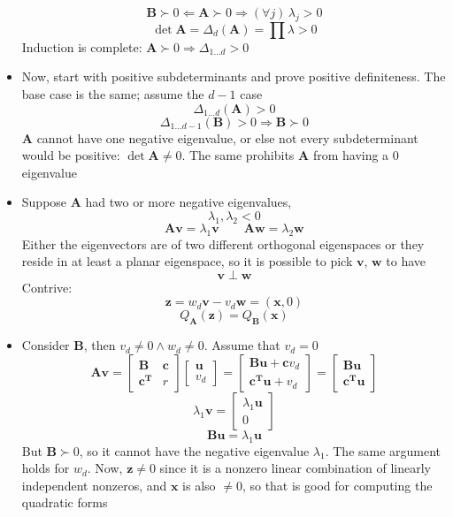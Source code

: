\documentclass[10pt, oneside]{article}
\renewcommand{\vec}[1]{\mathbf{#1}}
\newcommand{\mat}[1]{\mathbf{#1}}
\begin{document}
\begin{itemize}
            \[\mat{B} \succ 0 \Leftarrow \mat{A} \succ 0 \Rightarrow (\forall j) \,  \lambda_j > 0\]
            \[\det \mat{A} = \Delta_d(\mat{A}) = \prod \lambda > 0\]
        Induction is complete: $\mat{A} \succ 0 \Rightarrow \Delta_{1 \hdots d} > 0$
    \item Now, start with positive subdeterminants and prove positive definiteness. The base case is the same; assume the $d-1$ case
            \[\Delta_{1 \hdots d} (\mat{A}) > 0\]
            \[\Delta_{1 \hdots d-1}(\mat{B}) > 0 \Rightarrow \mat{B} \succ 0\]
        $\mat{A}$ cannot have one negative eigenvalue, or else not every subdeterminant would be positive: $\det \mat{A} \neq 0$. The same prohibits $\mat{A}$ from having a $0$ eigenvalue
    \item Suppose $\mat{A}$ had two or more negative eigenvalues,
            \[\lambda_1, \lambda_2 < 0\]
            \[\mat{A}\vec{v} = \lambda_1\vec{v} \quad \quad \mat{A}\vec{w} = \lambda_2\vec{w}\]
        Either the eigenvectors are of two different orthogonal eigenspaces or they reside in at least a planar eigenspace, so it is possible to pick $\vec{v}$, $\vec{w}$ to have
            \[\vec{v} \perp \vec{w}\]
        Contrive:
            \[\vec{z} = w_d\vec{v} - v_d\vec{w} = (\vec{x},0)\]
            \[Q_\mat{A}(\vec{z}) = Q_\mat{B}(\vec{x})\]
    \item Consider $\mat{B}$, then $v_d \neq 0 \land w_d \neq 0$. Assume that $v_d = 0$
            \[\mat{A}\vec{v} = \begin{bmatrix} \mat{B} & \vec{c}\\ \vec{c^T} & r \end{bmatrix} \begin{bmatrix} \vec{u} \\ v_d \end{bmatrix} = \begin{bmatrix} \mat{B}\vec{u} + \vec{c}v_d \\ \vec{c^T}\vec{u} + v_d \end{bmatrix} = \begin{bmatrix} \mat{B}\vec{u} \\ \vec{c^T}\vec{u} \end{bmatrix}\]
            \[\lambda_1 \vec{v} = \begin{bmatrix} \lambda_1 \vec{u} \\ 0 \end{bmatrix}\]
            \[\mat{B}\vec{u} = \lambda_1\vec{u}\]
        But $\mat{B} \succ 0$, so it cannot have the negative eigenvalue $\lambda_1$. The same argument holds for $w_d$. Now, $\vec{z} \neq 0$ since it is a nonzero linear combination of linearly independent nonzeros, and $\vec{x}$ is also $\neq 0$, so that is good for computing the quadratic forms

\end{itemize}
\end{document}
